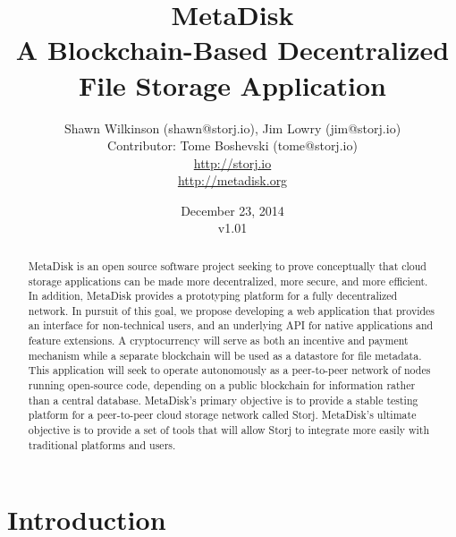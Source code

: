 \documentclass[a4paper,10pt]{article}
\begin{document}
\lstset{basicstyle=\ttfamily\footnotesize,breaklines=true}
\lstset{numbers=left, numberstyle=\tiny, stepnumber=1, numbersep=5pt}
\lstset{language=TeX}


\title{\textbf{MetaDisk\\A Blockchain-Based Decentralized\\File Storage Application}}
\author{Shawn Wilkinson (shawn@storj.io), Jim Lowry (jim@storj.io)\\ Contributor: Tome Boshevski (tome@storj.io)\\ \small \url{http://storj.io} \\  \small \url{http://metadisk.org}}
\date {December 23, 2014 \\ v1.01}
\maketitle


\begin{abstract}
MetaDisk is an open source software project seeking to prove conceptually that cloud storage applications can be made more decentralized, more secure, and more efficient. In addition, MetaDisk provides a prototyping platform for a fully decentralized network. In pursuit of this goal, we propose developing a web application that provides an interface for non-technical users, and an underlying API for native applications and feature extensions. A cryptocurrency will serve as both an incentive and payment mechanism while a separate blockchain will be used as a datastore for file metadata. This application will seek to operate autonomously as a peer-to-peer network of nodes running open-source code, depending on a public blockchain for information rather than a central database. MetaDisk’s primary objective is to provide a stable testing platform for a peer-to-peer cloud storage network called Storj. MetaDisk’s ultimate objective is to provide a set of tools that will allow Storj to integrate more easily with traditional platforms and users. 
\end{abstract}
\section{Introduction}
\end{document}
